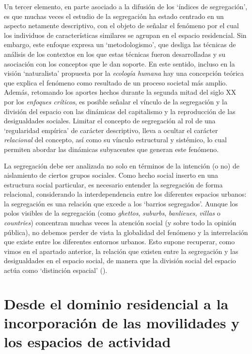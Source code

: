 \documentclass[
  spanish,
  a4paper,%
  chapterprefix=true,%
  DIV=calc,%
  twoside]{scrbook}%
\begin{document}
Un tercer elemento, en parte asociado a la difusión de los `índices de
segregación', es que muchas veces el estudio de la segregación ha estado
centrado en un aspecto netamente descriptivo, con el objeto de señalar
el fenómeno por el cual los individuos de características similares se
agrupan en el espacio residencial. Sin embargo, este enfoque expresa un
`metodologismo', que desliga las técnicas de análisis de los contextos
en los que estas técnicas fueron desarrolladas y su asociación con los
conceptos que le dan soporte. En este sentido, incluso en la visión
`naturalista' propuesta por la \emph{ecología humana} hay una concepción
teórica que explica el fenómeno como resultado de un proceso societal
más amplio. Además, retomando los aportes hechos durante la segunda
mitad del siglo XX por los \emph{enfoques críticos}, es posible señalar el
vínculo de la segregación y la división del espacio con las dinámicas
del capitalismo y la reproducción de las desigualdades sociales. Limitar
el concepto de segregación al rol de una `regularidad empírica' de
carácter descriptivo, lleva a ocultar el carácter \emph{relacional} del
concepto, así como su vínculo estructural y sistémico, lo cual permiten
abordar las dinámicas subyacentes que generan este fenómeno.

La segregación debe ser analizada no solo en términos de la intención (o
no) de aislamiento de ciertos grupos sociales. Como hecho social inserto
en una estructura social particular, es necesario entender la
segregación de forma relacional, considerando la interdependencia entre
los diferentes espacios urbanos: la segregación es una relación que
excede a los `barrios segregados'. Aunque los polos visibles de la
segregación (como \emph{ghettos}, \emph{suburbs}, \emph{banlieues}, \emph{villas} o
\emph{countries}) concentran muchas veces la atención social (y sobre todo la
opinión pública), no debemos perder de vista la globalidad del fenómeno
y la interrelación que existe entre los diferentes entornos urbanos.
Esto supone recuperar, como vimos en el apartado anterior, la relación
que existen entre la segregación y las desigualdades en el espacio
social, de manera que la división social del espacio actúa como
`distinción espacial' ().

\section{Desde el dominio residencial a la incorporación de las movilidades y los espacios de actividad}\label{lit-mobility}
\end{document}
